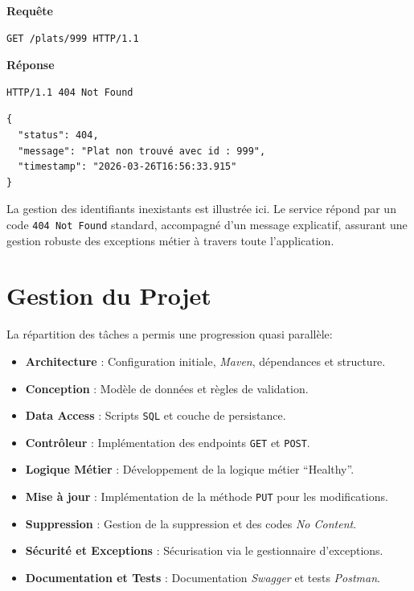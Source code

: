 \documentclass[12pt,a4paper,french]{article}
\begin{document}
\begin{tcolorbox}[projectbox, title=Test : Ressource non trouvée (Erreur 404)]
    \small\textbf{Requête}
    \begin{verbatim}
GET /plats/999 HTTP/1.1
\end{verbatim}
    \small\textbf{Réponse}
    \begin{verbatim}
HTTP/1.1 404 Not Found
\end{verbatim}
    \begin{verbatim}
{
  "status": 404,
  "message": "Plat non trouvé avec id : 999",
  "timestamp": "2026-03-26T16:56:33.915"
}
\end{verbatim}
\end{tcolorbox}
La gestion des identifiants inexistants est illustrée ici. Le service répond par un code
\texttt{404 Not Found} standard, accompagné d'un message explicatif, assurant une gestion
robuste des exceptions métier à travers toute l'application.

\section{Gestion du Projet}
La répartition des tâches a permis une progression quasi parallèle:
\begin{itemize}
    \item \textbf{Architecture} : Configuration initiale, \textit{Maven}, dépendances et structure.
    \item \textbf{Conception} : Modèle de données et règles de validation.
    \item \textbf{Data Access} : Scripts \texttt{SQL} et couche de persistance.
    \item \textbf{Contrôleur} : Implémentation des endpoints \texttt{GET} et \texttt{POST}.
    \item \textbf{Logique Métier} : Développement de la logique métier ``Healthy''.
    \item \textbf{Mise à jour} : Implémentation de la méthode \texttt{PUT} pour les modifications.
    \item \textbf{Suppression} : Gestion de la suppression et des codes \textit{No Content}.
    \item \textbf{Sécurité et Exceptions} : Sécurisation via le gestionnaire d'exceptions.
    \item \textbf{Documentation et Tests} : Documentation \textit{Swagger} et tests \textit{Postman}.
\end{itemize}
\end{document}
